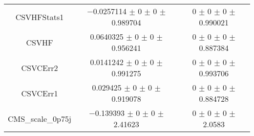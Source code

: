 \begin{table}
\begin{tabular}{ccc}
CSVHFStats1 & \num{-0.0257114} $\pm$ \num{0} $\pm$ \num{0} $\pm$ \num{0.989704} & \num{0} $\pm$ \num{0} $\pm$ \num{0} $\pm$ \num{0.990021}\\
CSVHF & \num{0.0640325} $\pm$ \num{0} $\pm$ \num{0} $\pm$ \num{0.956241} & \num{0} $\pm$ \num{0} $\pm$ \num{0} $\pm$ \num{0.887384}\\
CSVCErr2 & \num{0.0141242} $\pm$ \num{0} $\pm$ \num{0} $\pm$ \num{0.991275} & \num{0} $\pm$ \num{0} $\pm$ \num{0} $\pm$ \num{0.993706}\\
CSVCErr1 & \num{0.029425} $\pm$ \num{0} $\pm$ \num{0} $\pm$ \num{0.919078} & \num{0} $\pm$ \num{0} $\pm$ \num{0} $\pm$ \num{0.884728}\\
CMS\_scale\_0p75j & \num{-0.139393} $\pm$ \num{0} $\pm$ \num{0} $\pm$ \num{2.41623} & \num{0} $\pm$ \num{0} $\pm$ \num{0} $\pm$ \num{2.0583}\\
\bottomrule
\end{tabular}
\end{table}